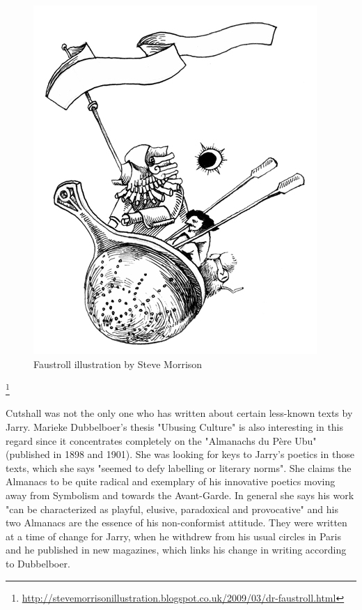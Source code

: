 \begin{figure}[!htbp]
  \centering
  \includegraphics[height=0.3\textheight]{images/faustroll}
  \caption[Faustroll]{Faustroll illustration by Steve Morrison}
  \label{fig:FAUSTROLL}
\end{figure}\footnote{\url{http://stevemorrisonillustration.blogspot.co.uk/2009/03/dr-faustroll.html}}

Cutshall was not the only one who has written about certain less-known texts by Jarry. Marieke Dubbelboer's thesis "Ubusing Culture" is also interesting in this regard since it concentrates completely on the "Almanachs du Père Ubu" (published in 1898 and 1901)\citep{Dubbelboer2009}. She was looking for keys to Jarry's poetics in those texts, which she says "seemed to defy labelling or literary norms"\citep[p.10]{Dubbelboer2009}. She claims the Almanacs to be quite radical and exemplary of his innovative poetics moving away from Symbolism and towards the Avant-Garde. In general she says his work "can be characterized as playful, elusive, paradoxical and provocative"\citep[p.197]{Dubbelboer2009} and his two Almanacs are the essence of his non-conformist attitude. They were written at a time of change for Jarry, when he withdrew from his usual circles in Paris and he published in new magazines, which links his change in writing according to Dubbelboer.

